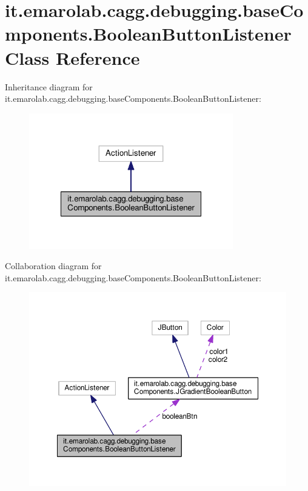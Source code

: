 \hypertarget{classit_1_1emarolab_1_1cagg_1_1debugging_1_1baseComponents_1_1BooleanButtonListener}{\section{it.\-emarolab.\-cagg.\-debugging.\-base\-Components.\-Boolean\-Button\-Listener Class Reference}
\label{classit_1_1emarolab_1_1cagg_1_1debugging_1_1baseComponents_1_1BooleanButtonListener}
}


Inheritance diagram for it.\-emarolab.\-cagg.\-debugging.\-base\-Components.\-Boolean\-Button\-Listener\-:\nopagebreak
\begin{figure}[H]
\begin{center}
\leavevmode
\includegraphics[width=252pt]{classit_1_1emarolab_1_1cagg_1_1debugging_1_1baseComponents_1_1BooleanButtonListener__inherit__graph}
\end{center}
\end{figure}


Collaboration diagram for it.\-emarolab.\-cagg.\-debugging.\-base\-Components.\-Boolean\-Button\-Listener\-:\nopagebreak
\begin{figure}[H]
\begin{center}
\leavevmode
\includegraphics[width=350pt]{classit_1_1emarolab_1_1cagg_1_1debugging_1_1baseComponents_1_1BooleanButtonListener__coll__graph}
\end{center}
\end{figure}
